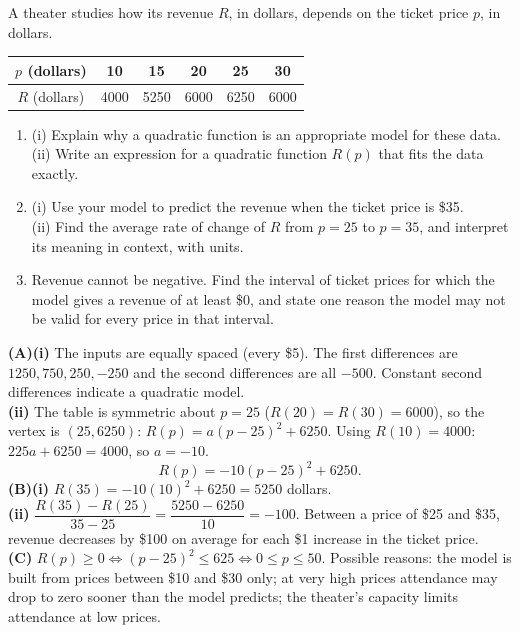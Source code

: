 \documentclass[11pt]{article}
\begin{document}
\begin{exo}{\calcreq}
A theater studies how its revenue $R$, in dollars, depends on the ticket price $p$, in dollars.
\begin{center}\begin{tabular}{c|ccccc}
$p$ (dollars) & 10 & 15 & 20 & 25 & 30\\\hline $R$ (dollars) & 4000 & 5250 & 6000 & 6250 & 6000\end{tabular}\end{center}
\begin{enumerate}[label=(\Alph*)]
\item (i) Explain why a quadratic function is an appropriate model for these data.\\
(ii) Write an expression for a quadratic function $R(p)$ that fits the data exactly.
\item (i) Use your model to predict the revenue when the ticket price is \$35.\\
(ii) Find the average rate of change of $R$ from $p=25$ to $p=35$, and interpret its meaning in context, with units.
\item Revenue cannot be negative. Find the interval of ticket prices for which the model gives a revenue of at least \$0, and state one reason the model may not be valid for every price in that interval.
\end{enumerate}
\begin{solution}
\textbf{(A)(i)} The inputs are equally spaced (every \$5). The first differences are $1250, 750, 250, -250$ and the second differences are all $-500$. Constant second differences indicate a quadratic model.\\
\textbf{(ii)} The table is symmetric about $p=25$ ($R(20)=R(30)=6000$), so the vertex is $(25, 6250)$: $R(p)=a(p-25)^2+6250$. Using $R(10)=4000$: $225a+6250=4000$, so $a=-10$.
\[R(p)=-10(p-25)^2+6250.\]
\textbf{(B)(i)} $R(35)=-10(10)^2+6250=5250$ dollars.\\
\textbf{(ii)} $\dfrac{R(35)-R(25)}{35-25}=\dfrac{5250-6250}{10}=-100$. Between a price of \$25 and \$35, revenue decreases by \$100 on average for each \$1 increase in the ticket price.\\
\textbf{(C)} $R(p)\ge0 \iff (p-25)^2\le625 \iff 0\le p\le50$. Possible reasons: the model is built from prices between \$10 and \$30 only; at very high prices attendance may drop to zero sooner than the model predicts; the theater's capacity limits attendance at low prices.
\end{solution}
\end{exo}
\end{document}

